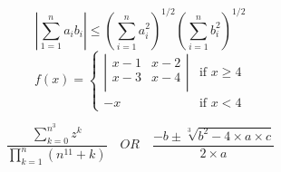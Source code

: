 \documentclass[a4paper,10pt]{article}
\begin{document}
\[
 \left|\sum^{n}_{1=1} a_i b_i
 \right|
 \leq
 {\left(\sum^{n}_{i=1} a^{2}_i
  \right)}^{1/2}
  {\left(\sum^{n}_{i=1} b^{2}_i
  \right)}^{1/2}
\]
\[f(x) = 
 \left\{
 \begin{array}{ll}
  \left|
        \begin{array}{ll}
               x-1 & x-2 \\
               x-3 & x-4 \\
        \end{array}
        \right|& \mbox{if $x\geq4$}\\
        -x & \mbox{if $x<4$}
        \end{array}
  \right.
\]
 
\[
\frac{\sum\limits^{n^{3}}_{k=0} z^k}{\prod\limits^{n}_{k=1} (n^{11} + k)} \quad OR \quad \frac{-b\pm\sqrt[3]{b^2-4\times a \times c}}{2\times a} 
\]
\end{document}
